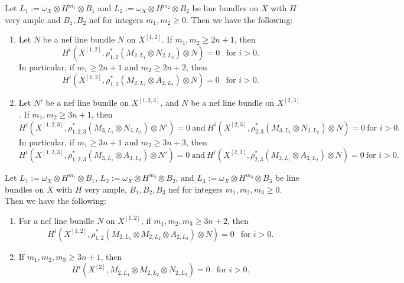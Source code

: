 \documentclass[10pt,a4paper]{amsart}
\begin{document}
\begin{prop}\label{prop:mainvanishing1}
Let $L_1:=\omega_X \otimes H^{m_1} \otimes B_1$ and $L_2:=\omega_X \otimes H^{m_2} \otimes B_2$ be line bundles on $X$ with $H$ very ample and $B_1, B_2$ nef for integers $m_1, m_2 \geq 0$. Then we have the following:
\begin{enumerate}
    \item Let $N$ be a nef line bundle $N$ on $X^{[1,2]}$. If $m_1, m_2 \geq 2n+1$, then 
    $$
    H^i(X^{[1,2]}, \rho_{1,2}^* (M_{2,L_1} \otimes N_{2,L_2}) \otimes N)=0~~\text{ for $i>0$}.
    $$
    In particular, if $m_1 \geq 2n+1$ and $m_2 \geq 2n+2$, then 
     $$
    H^i(X^{[1,2]}, \rho_{1,2}^* (M_{2,L_1} \otimes A_{2,L_2}) \otimes N)=0~~\text{ for $i>0$}.
    $$
    \item Let $N'$ be a nef line bundle on $X^{[1,2,3]}$, and $N$ be a nef line bundle on $X^{[2,3]}$. If $m_1, m_2 \geq 3n+1$, then 
    $$
    H^i(X^{[1,2,3]}, \rho_{1,2,3}^* (M_{3, L_1} \otimes N_{3,L_2}) \otimes N') = 0~\text{and}~H^i(X^{[2,3]}, \rho_{2,3}^* (M_{3, L_1} \otimes N_{3,L_2}) \otimes N)=0~\text{for $i>0$}. 
    $$
    In particular, if $m_1 \geq 3n+1$ and $m_2 \geq 3n+3$, then 
    $$
    H^i(X^{[1,2,3]}, \rho_{1,2,3}^* (M_{3, L_1} \otimes A_{3,L_2}) \otimes N') = 0~\text{and}~H^i(X^{[2,3]}, \rho_{2,3}^* (M_{3, L_1} \otimes A_{3,L_2}) \otimes N)=0~\text{for $i>0$}. 
    $$
\end{enumerate}
\end{prop}

\begin{prop}\label{prop:mainvanishing2}
Let $L_1:=\omega_X \otimes H^{m_1} \otimes B_1$, $L_2:=\omega_X \otimes H^{m_2} \otimes B_2$, and $L_3:=\omega_X \otimes H^{m_3} \otimes B_3$ be line bundles on $X$ with $H$ very ample, $B_1, B_2, B_3$ nef for integers $m_1, m_2, m_3 \geq 0$. Then we have the following:
\begin{enumerate}
\item For a nef line bundle $N$ on $X^{[1,2]}$, if $m_1, m_2, m_3 \geq 3n+2$, then  
$$
H^i(X^{[1,2]}, \rho_{1,2}^* (M_{2,L_1} \otimes M_{2, L_2} \otimes A_{2, L_3}) \otimes N) = 0~~\text{ for $i>0$}. 
$$
\item If $m_1, m_2, m_3 \geq 3n+1$, then 
$$
H^i(X^{[2]}, M_{2,L_1} \otimes M_{2, L_2} \otimes N_{2, L_3}) = 0~~\text{ for $i>0$}. 
$$
\end{enumerate}
\end{prop}
\end{document}
